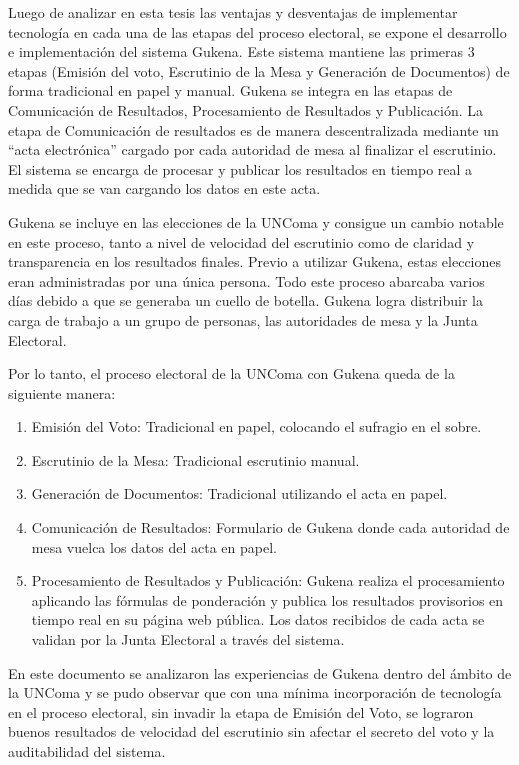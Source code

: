 Luego de analizar en esta tesis las ventajas y desventajas de implementar tecnología en cada una de las etapas del proceso electoral, se expone el desarrollo e implementación del sistema Gukena. Este sistema mantiene las primeras 3 etapas (Emisión del voto, Escrutinio de la Mesa y Generación de Documentos) de forma tradicional en papel y manual. Gukena se integra en las etapas de Comunicación de Resultados, Procesamiento de Resultados y Publicación. La etapa de Comunicación de resultados es de manera descentralizada mediante un ``acta electrónica'' cargado por cada autoridad de mesa al finalizar el escrutinio. El sistema se encarga de procesar y publicar los resultados en tiempo real a medida que se van cargando los datos en este acta.

Gukena se incluye en las elecciones de la UNComa y consigue un cambio notable en este proceso, tanto a nivel de velocidad del escrutinio como de claridad y transparencia en los resultados finales. Previo a utilizar Gukena, estas elecciones eran administradas por una única persona. Todo este proceso abarcaba varios días debido a que se generaba un cuello de botella. Gukena logra distribuir la carga de trabajo a un grupo de personas, las autoridades de mesa y la Junta Electoral.

Por lo tanto, el proceso electoral de la UNComa con Gukena queda de la siguiente manera:
\begin{enumerate}
    \item Emisión del Voto: Tradicional en papel, colocando el sufragio en el sobre.
    \item Escrutinio de la Mesa: Tradicional escrutinio manual.
    \item Generación de Documentos: Tradicional utilizando el acta en papel.
    \item Comunicación de Resultados: Formulario de Gukena donde cada autoridad de mesa vuelca los datos del acta en papel.
    \item Procesamiento de Resultados y Publicación: Gukena realiza el procesamiento aplicando las fórmulas de ponderación y publica los resultados provisorios en tiempo real en su página web pública. Los datos recibidos de cada acta se validan por la Junta Electoral a través del sistema.
\end{enumerate}

En este documento se analizaron las experiencias de Gukena dentro del ámbito de la UNComa y se pudo observar que con una mínima incorporación de tecnología en el proceso electoral, sin invadir la etapa de Emisión del Voto, se lograron buenos resultados de velocidad del escrutinio sin afectar el secreto del voto y la auditabilidad del sistema.

